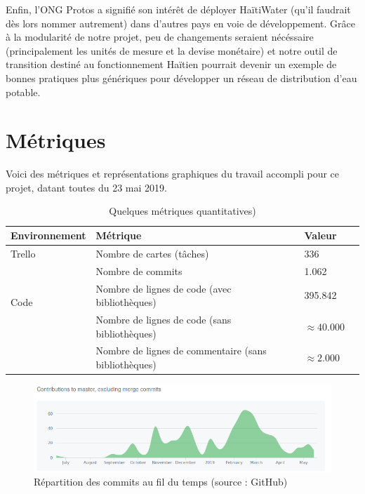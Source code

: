 \documentclass{EPL-master-thesis-covers-FR}
\begin{document}
		Enfin, l'ONG Protos a signifié son intérêt de déployer HaïtiWater (qu'il faudrait dès lors nommer autrement) dans d'autres pays en voie de développement. Grâce à la modularité de notre projet, peu de changements seraient nécéssaire (principalement les unités de mesure et la devise monétaire) et notre outil de transition destiné au fonctionnement Haïtien pourrait devenir un exemple de bonnes pratiques plus génériques pour développer un réseau de distribution d'eau potable.

		\section{Métriques}
			Voici des métriques et représentations graphiques du travail accompli pour ce projet, datant toutes du 23 mai 2019.
			\begin{table}[H]
				\centering
				\begin{tabular}{@{}lllr@{}}
					\toprule
					Environnement	& Métrique	& Valeur \\
					\midrule
					\multirow{1}{*}{Trello} & Nombre de cartes (tâches)  & 336  \\
					\bottomrule
					\multirow{3}{*}{Code} & Nombre de commits & 1.062 \\
						& Nombre de lignes de code (avec bibliothèques) & 395.842\\
						& Nombre de lignes de code (sans bibliothèques) & $\approx 40.000$\\
						& Nombre de lignes de commentaire (sans bibliothèques) & $\approx 2.000$\\
					\bottomrule
				\end{tabular}
				\caption{Quelques métriques quantitatives)}
				\label{tab:table_metriques}
			\end{table}

			\begin{figure}[H]
					\includegraphics[width=\textwidth]{images/graph_git}
					\caption{Répartition des commits au fil du temps (source : GitHub)}
					\label{fig:graph_git}
			\end{figure}
\end{document}
